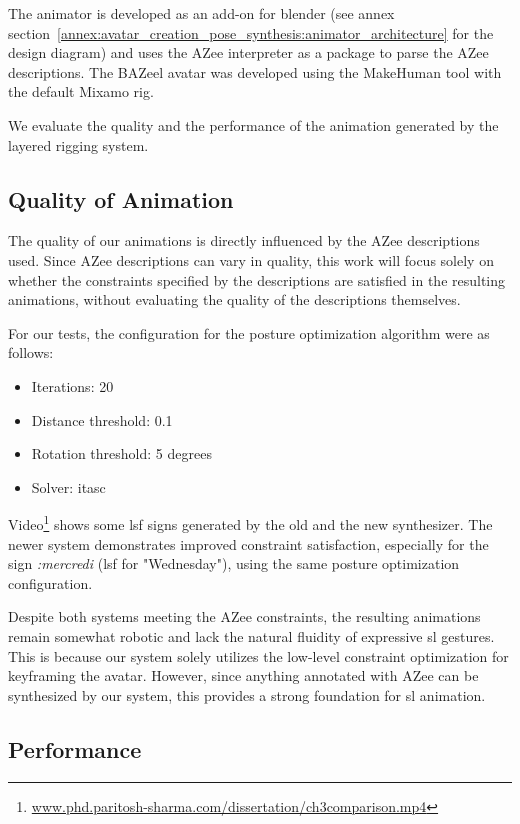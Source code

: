 \documentclass[../../main.tex]{subfiles}
\begin{document}
The animator is developed as an add-on for blender (see annex section~\ref{annex:avatar_creation_pose_synthesis:animator_architecture} for the design diagram) and uses the AZee interpreter as a package to parse the AZee descriptions. The BAZeel avatar was developed using the MakeHuman tool with the default Mixamo rig. 

We evaluate the quality and the performance of the animation generated by the layered rigging system.

\subsection{Quality of Animation}
\label{ch:avatar_creation_pose_synthesis:evaluation:quality}

The quality of our animations is directly influenced by the AZee descriptions used. Since AZee descriptions can vary in quality, this work will focus solely on whether the constraints specified by the descriptions are satisfied in the resulting animations, without evaluating the quality of the descriptions themselves.

For our tests, the configuration for the posture optimization algorithm were as follows:
\begin{itemize}
    \item Iterations: 20
    \item Distance threshold: 0.1
    \item Rotation threshold: 5 degrees
    \item Solver: \gls{itasc}
\end{itemize}

Video\footnote{\url{www.phd.paritosh-sharma.com/dissertation/ch3comparison.mp4}} shows some \gls{lsf} signs generated by the old and the new synthesizer. The newer system demonstrates improved constraint satisfaction, especially for the sign \emph{:mercredi} (\gls{lsf} for "Wednesday"), using the same posture optimization configuration.

Despite both systems meeting the AZee constraints, the resulting animations remain somewhat robotic and lack the natural fluidity of expressive \gls{sl} gestures. This is because our system solely utilizes the low-level constraint optimization for keyframing the avatar. However, since anything annotated with AZee can be synthesized by our system, this provides a strong foundation for \gls{sl} animation.

\subsection{Performance}
\label{ch:avatar_creation_pose_synthesis:evaluation:performance}
\end{document}
